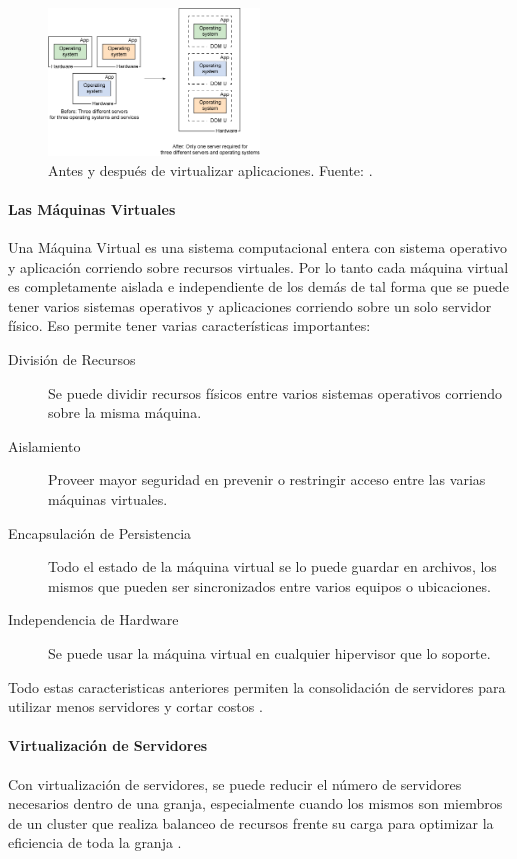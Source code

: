 \begin{figure}
  \begin{center}
      \includegraphics[width=0.5\textwidth]{Figures/ibm-virtualization.png}
  \end{center}
  \caption{Antes y después de virtualizar aplicaciones. Fuente: \citep{IBM-Hypervisors}.}
  \label{IBM-Virtualization}
\end{figure}

\paragraph{Las Máquinas Virtuales}
Una Máquina Virtual es una sistema computacional entera con sistema operativo y aplicación corriendo sobre recursos virtuales. Por lo tanto cada máquina virtual es completamente aislada e independiente de los demás de tal forma que se puede tener varios sistemas operativos y aplicaciones corriendo sobre un solo servidor físico. Eso permite tener varias características importantes:
\begin{description}
	\item[División de Recursos] Se puede dividir recursos físicos entre varios sistemas operativos corriendo sobre la misma máquina.
    \item[Aislamiento] Proveer mayor seguridad en prevenir o restringir acceso entre las varias máquinas virtuales.
    \item[Encapsulación de Persistencia] Todo el estado de la máquina virtual se lo puede guardar en archivos, los mismos que pueden ser sincronizados entre varios equipos o ubicaciones.
    \item[Independencia de Hardware] Se puede usar la máquina virtual en cualquier hipervisor que lo soporte.
\end{description}
Todo estas caracteristicas anteriores permiten la consolidación de servidores para utilizar menos servidores y cortar costos \citep{VMWare-Virtualization}.

\paragraph{Virtualización de Servidores}
Con virtualización de servidores, se puede reducir el número de servidores necesarios dentro de una granja, especialmente cuando los mismos son miembros de un cluster que realiza balanceo de recursos frente su carga para optimizar la eficiencia de toda la granja \citep{VMWare-Virtualization}.


